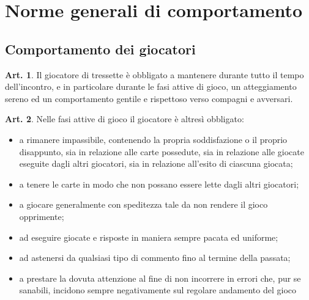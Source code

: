 \documentclass[italian,a4paper]{book}
\theoremstyle{definition}
\newtheorem{art}{Art.}
\newenvironment{packeditem}{
\begin{itemize}
  \setlength{\itemsep}{1pt}
  \setlength{\parskip}{0pt}
  \setlength{\parsep}{0pt}
}{\end{itemize}}
\begin{document}
\section{Norme generali di comportamento}
\subsection{Comportamento dei giocatori}
\begin{art}
    Il giocatore di tressette è obbligato a mantenere durante tutto il tempo dell'incontro, e in particolare durante le fasi attive di gioco, un atteggiamento sereno ed un comportamento gentile e rispettoso verso compagni e avversari.
\end{art}
\begin{art}
    Nelle fasi attive di gioco il giocatore è altresì obbligato:
    \begin{packeditem}
\item      a rimanere impassibile, contenendo la propria soddisfazione o il proprio disappunto, sia in relazione alle carte possedute, sia in relazione alle giocate eseguite dagli altri giocatori, sia in relazione all'esito di ciascuna giocata;
\item      a tenere le carte in modo che non possano essere lette dagli altri giocatori;
\item      a giocare generalmente con speditezza tale da non rendere il gioco opprimente;
\item      ad eseguire giocate e risposte in maniera sempre pacata ed uniforme;
\item      ad astenersi da qualsiasi tipo di commento fino al termine della passata;
\item       a prestare la dovuta attenzione al fine di non incorrere in errori che, pur se sanabili, incidono sempre negativamente sul regolare andamento del gioco
    \end{packeditem}
\end{art}
\end{document}
